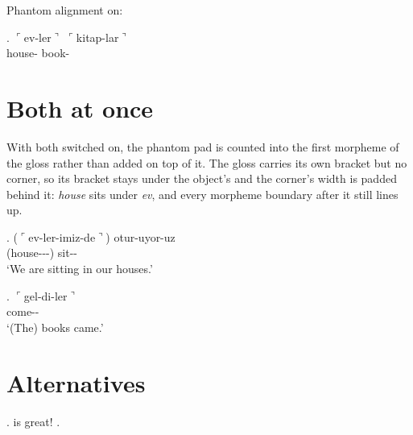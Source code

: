 \documentclass[11pt]{article}
\newcommand{\qq}{\ensuremath{\ulcorner}}
\newcommand{\qqr}{\ensuremath{\urcorner}}
\begin{document}
\noindent Phantom alignment on:

{\GlossPhantomAlign
\ex. \gll \qq{}ev-ler\qqr{} \qq{}kitap-lar\qqr{} \\
          house- book- \\

}

\section{Both at once}

With both switched on, the phantom pad is counted into the first morpheme
of the gloss rather than added on top of it. The gloss carries its own
bracket but no corner, so its bracket stays under the object's and the
corner's width is padded behind it: \textit{house} sits under \textit{ev},
and every morpheme boundary after it still lines up.

{\GlossPhantomAlign\GlossMorphAlign
\ex. \gll (\qq{}ev-ler-imiz-de\qqr{}) otur-uyor-uz \\
          (house---) sit-- \\
\glt `We are sitting in our houses.'

\ex. \gll [\qq{}kitap-lar\qqr{}] \qq{}gel-di-ler\qqr{} \\
          [book-\lpzg{pl}] come-- \\
\glt `(The) books came.'

}

\section{Alternatives}
{\GlossPhantomAlign
  \ex.  is  great!
  \z.
}  
\end{document}
